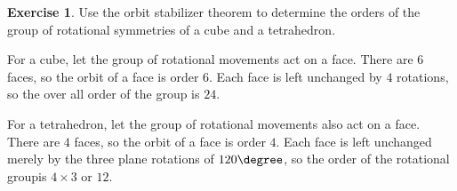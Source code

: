 \documentclass[11pt,oneside]{article}
\numberwithin{equation}{section}
\theoremstyle{definition}
\newtheorem{exercise}{Exercise}
\begin{document}
\begin{exercise}
  Use the orbit stabilizer theorem to determine the orders of the
  group of rotational symmetries of a cube and a tetrahedron.  
\end{exercise}
\begin{solution}
  For a cube, let the group of rotational movements act on a face.
  There are $6$ faces, so the orbit of a face is order $6$.  Each face is
  left unchanged by $4$ rotations, so the over all order of the group is $24$.

  For a tetrahedron, let the group of rotational movements also act on
  a face.  There are $4$ faces, so the orbit of a face is order $4$.
  Each face is left unchanged merely by the three plane rotations of
  $120 \degree$, so the order of the rotational groupis $4 \times 3$
  or $12$.
\end{solution}
\end{document}
